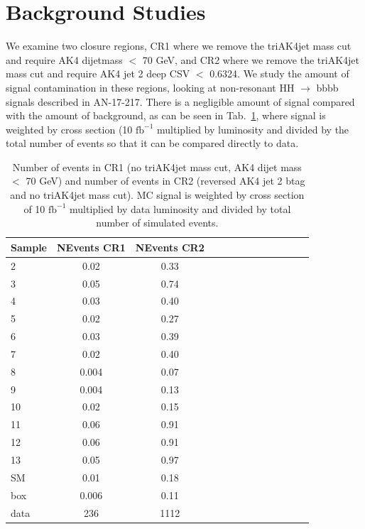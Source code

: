\section{Background Studies\label{app:background}}
We examine two closure regions, CR1 where we remove the triAK4jet mass cut and require AK4 dijetmass $<$ 70 GeV, and CR2 where we remove the triAK4jet mass cut and require AK4 jet 2 deep CSV $<$ 0.6324. We study the amount of signal contamination in these regions, looking at non-resonant HH $\rightarrow$ bbbb signals described in AN-17-217. There is a negligible amount of signal compared with the amount of background, as can be seen in Tab.~\ref{tab:CRcontam}, where signal is weighted by cross section (10 $\text{fb}^{-1}$ multiplied by luminosity and divided by the total number of events so that it can be compared directly to data.
\begin{table}[h]
\begin{tabular}{|l|c|c|c|c|c|c|c|c|c|c|c|c|}
\hline
Sample & NEvents CR1 & NEvents CR2 \\ \hline
2 & 0.02 & 0.33 \\
3 & 0.05 & 0.74 \\
4 & 0.03 & 0.40 \\
5 & 0.02 & 0.27 \\
6 & 0.03 & 0.39 \\
7 & 0.02 & 0.40 \\
8 & 0.004 & 0.07 \\
9 & 0.004 & 0.13 \\
10 & 0.02 & 0.15 \\
11 & 0.06 & 0.91 \\
12 & 0.06 & 0.91 \\
13 & 0.05 & 0.97 \\
SM & 0.01 & 0.18 \\
box & 0.006 & 0.11 \\
data & 236 & 1112 \\
\hline
\end{tabular}
\caption{Number of events in CR1 (no triAK4jet mass cut, AK4 dijet mass $<$ 70 GeV) and number of events in CR2 (reversed AK4 jet 2 btag and no triAK4jet mass cut). MC signal is weighted by cross section of 10 $\text{fb}^{-1}$ multiplied by data luminosity and divided by total number of simulated events.}\label{tab:CRcontam}
\end{table}

